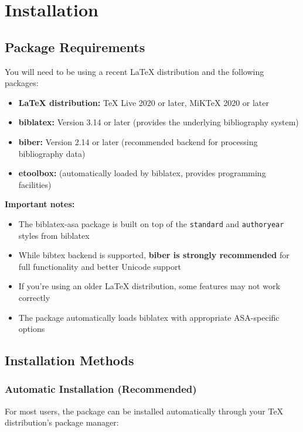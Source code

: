 \documentclass[11pt,a4paper]{ltxdoc}
\begin{document}
\section{Installation}

\subsection{Package Requirements}

You will need to be using a recent LaTeX distribution and the following packages:

\begin{itemize}
  \item \textbf{LaTeX distribution:} TeX Live 2020 or later, MiKTeX 2020 or later
  \item \textbf{biblatex:} Version 3.14 or later (provides the underlying bibliography system)
  \item \textbf{biber:} Version 2.14 or later (recommended backend for processing bibliography data)
  \item \textbf{etoolbox:} (automatically loaded by biblatex, provides programming facilities)
\end{itemize}

\textbf{Important notes:}
\begin{itemize}
  \item The \textsf{biblatex-asa} package is built on top of the \texttt{standard} and \texttt{authoryear} styles from biblatex
  \item While bibtex backend is supported, \textbf{biber is strongly recommended} for full functionality and better Unicode support
  \item If you're using an older LaTeX distribution, some features may not work correctly
  \item The package automatically loads biblatex with appropriate ASA-specific options
\end{itemize}

\subsection{Installation Methods}

\subsubsection{Automatic Installation (Recommended)}

For most users, the package can be installed automatically through your TeX distribution's package manager:
\end{document}
